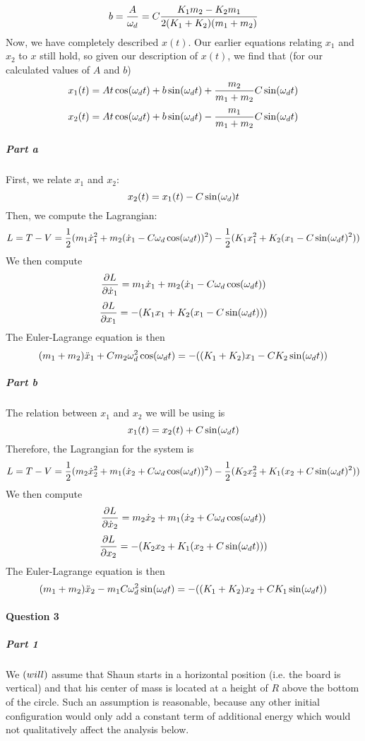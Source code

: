 $$b=\frac{A}{\omega_d}=C\frac{K_1 m_2-K_2 m_1}{2(K_1+K_2)(m_1+m_2)}$$
Now, we have completely described $x(t)$.  Our earlier equations relating $x_1$ and $x_2$ to $x$ still hold, so given our description of $x(t)$, we find that (for our calculated values of $A$ and $b$)
$$x_1(t)=At \cos(\omega_d t)+b\sin(\omega_d t)+\frac{m_2}{m_1+m_2} C\sin(\omega_d t)$$
$$x_2(t)=At\cos(\omega_d t)+b\sin(\omega_d t)-\frac{m_1}{m_1+m_2}C\sin(\omega_d t)$$
\subparagraph{Part a}  First, we relate $x_1$ and $x_2$:
$$x_2(t)= x_1(t)-C\sin(\omega_d) t$$
Then, we compute the Lagrangian:
$$L=T-V= \frac 1 2 (m_1 \dot x_1^2 + m_2 (\dot x_1 - C\omega_d \cos(\omega_d t))^2)-\frac 1 2 (K_1 x_1^2+K_2 (x_1-C \sin(\omega_d t)^2))$$
We then compute
$$\frac{\partial L}{\partial \dot x_1}= m_1 \dot x_1 + m_2 (\dot x_1 - C \omega_d \cos(\omega_d t))$$
$$\frac{\partial L}{\partial x_1}=-(K_1 x_1+K_2(x_1-C\sin (\omega_d t)))$$
The Euler-Lagrange equation is then 
$$  (m_1+m_2)\ddot x_1 + C m_2 \omega_d^2 \cos(\omega_d t)=-((K_1+K_2) x_1 - C K_2 \sin(\omega_d t))$$
\subparagraph{Part b}  The relation between $x_1$ and $x_2$ we will be using is
$$x_1(t)=x_2(t) + C\sin(\omega_d t)$$
Therefore, the Lagrangian for the system is 
$$L=T-V= \frac 1 2 (m_2 \dot x_2^2 + m_1 (\dot x_2 + C\omega_d \cos(\omega_d t))^2)-\frac 1 2 (K_2 x_2^2+K_1 (x_2+C \sin(\omega_d t)^2))$$
We then compute
$$\frac{\partial L}{\partial \dot x_2}= m_2 \dot x_2 + m_1 (\dot x_2+ C \omega_d \cos(\omega_d t))$$
$$\frac{\partial L}{\partial x_2}=-(K_2 x_2+K_1(x_2+C\sin (\omega_d t)))$$
The Euler-Lagrange equation is then
$$ (m_1+m_2) \ddot x_2-m_1 C \omega_d^2 \sin(\omega_d t)=-((K_1+K_2) x_2+C K_1 \sin(\omega_d t))$$

\paragraph{Question 3}
\subparagraph{Part 1}
We $\left(will \right)$ assume that Shaun starts in a horizontal position (i.e. the board is vertical) and that his center of mass is located at a height of $R$ above the bottom of the circle. Such an assumption is reasonable, because any other initial configuration would only add a constant term of additional energy which would not qualitatively affect the analysis below.

